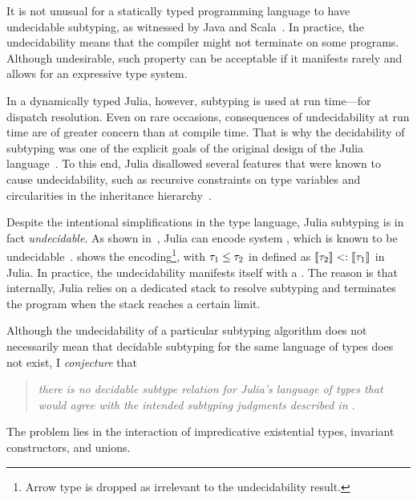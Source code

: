 It is not unusual for a statically typed programming language 
to have undecidable subtyping,
as witnessed by Java and Scala~\cite{grigore:java-undec:2017,hu:dot-undec:2020}.
In practice, the undecidability means that the
compiler might not terminate on some programs. Although undesirable,
such property can be acceptable if it manifests rarely and
allows for an expressive type system.

In a dynamically typed Julia, however, subtyping is used at run time---for
dispatch resolution. Even on rare occasions, consequences of
undecidability at run time are of greater concern than at compile time.
That is why the decidability of subtyping was one of the explicit goals
of the original design of the Julia language~\cite{bib:bezanson:julia:2015}.
To this end, Julia disallowed several features that were known to cause
undecidability, such as recursive constraints on type variables and
circularities in the inheritance hierarchy~\cite{tate:taming-wildcards:2011}.

Despite the intentional simplifications in the type language,
Julia subtyping is in fact \emph{undecidable}.
As shown in~, Julia can encode system
\FSubN, which is known to be undecidable~\cite{pierce:bound-sub-undec:1992}.
 shows the encoding\footnote{Arrow %
type is dropped as irrelevant to the undecidability result.},
with $\tau_1 \leq \tau_2$ in \FSubN defined as
$\llbracket \tau_2 \rrbracket <: \llbracket \tau_1 \rrbracket$ in Julia.
In practice, the undecidability %
manifests itself with a .
The reason is that internally, Julia relies on a dedicated stack
to resolve subtyping
and terminates the program when the stack reaches a certain limit.

Although the undecidability of a particular subtyping algorithm
does not necessarily mean that decidable subtyping for the same
language of types does not exist, I \emph{conjecture} that
\begin{quotation}\emph{
  there is no decidable subtype relation for Julia's language of types
  that would agree with the intended subtyping judgments
  described in .
}\end{quotation}
The problem lies in the interaction of
impredicative existential types, invariant constructors, and unions.

